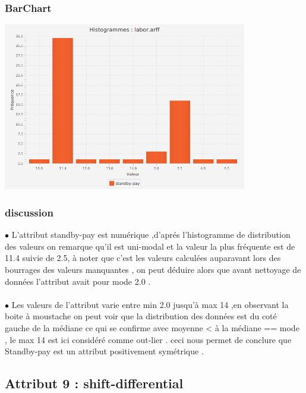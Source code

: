 \documentclass[12pt,a4paper,oneside]{book}
\begin{document}
	
	\subsubsection{BarChart}
	\begin{center}
		\includegraphics[width=0.8\textwidth]{screens/barchart/standby-pay-barchart.png}%
		\label{labelname}%
	\end{center}
	
	\subsubsection{discussion}
	$\bullet$ L'attribut standby-pay est numérique ,d'aprés l'histogramme de distribution des valeurs on remarque qu'il est uni-modal et la valeur la plus fréquente est de 11.4 suivie de 2.5, à noter que c'est les valeurs calculées auparavant lors des bourrages des valeurs manquantes , on peut déduire alors que avant nettoyage de données l'attribut avait pour mode 2.0 .\\
	\textbf{ }\\
	$\bullet$ Les valeurs de l'attribut varie entre min 2.0 jusqu'à max 14 ,en observant la boite à moustache on peut voir que la distribution des données est du coté gauche de la médiane ce qui se confirme avec moyenne < à la médiane == mode , le max 14 est ici considéré comme out-lier .
	ceci nous permet de conclure que Standby-pay est un attribut positivement symétrique .
	
	\newpage
	
	
	\subsection{Attribut 9 : shift-differential }
\end{document}
